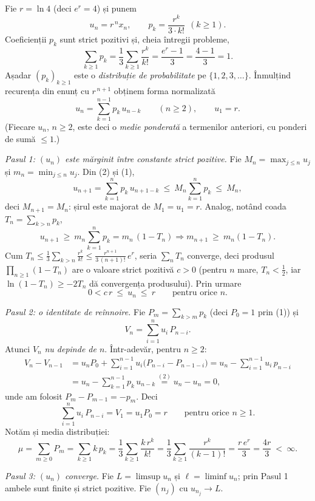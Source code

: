 Fie $r=\ln4$ (deci $e^{r}=4$) și punem
\[ u_n=r^{\,n}x_n,\qquad p_k=\frac{r^{k}}{3\cdot k!}\ \ (k\ge1) . \]
Coeficienții $p_k$ sunt strict pozitivi și, cheia întregii probleme,
\[ \sum_{k\ge1}p_k=\frac{1}{3}\sum_{k\ge1}\frac{r^k}{k!}=\frac{e^{r}-1}{3}=\frac{4-1}{3}=1 . \tag{1} \]
Așadar $(p_k)_{k\ge1}$ este o \emph{distribuție de probabilitate} pe $\{1,2,3,\dots\}$. Înmulțind recurența din enunț cu $r^{\,n+1}$ obținem forma normalizată
\[ u_{n}=\sum_{k=1}^{n-1}p_k\,u_{n-k}\qquad(n\ge2),\qquad u_1=r . \tag{2} \]
(Fiecare $u_n$, $n\ge2$, este deci o \emph{medie ponderată} a termenilor anteriori, cu ponderi de sumă $\le1$.)

\emph{Pasul 1: $(u_n)$ este mărginit între constante strict pozitive.}
Fie $M_n=\max_{j\le n}u_j$ și $m_n=\min_{j\le n}u_j$. Din (2) și (1),
\[ u_{n+1}=\sum_{k=1}^{n}p_k\,u_{n+1-k}\ \le\ M_n\sum_{k=1}^{n}p_k\ \le\ M_n , \]
deci $M_{n+1}=M_n$: șirul este majorat de $M_1=u_1=r$. Analog, notând coada $T_n=\sum_{k>n}p_k$,
\[ u_{n+1}\ \ge\ m_n\sum_{k=1}^{n}p_k=m_n\,(1-T_n) \Longrightarrow m_{n+1}\ \ge\ m_n(1-T_n) . \]
Cum $T_n\le\frac{1}{3}\sum_{k>n}\frac{r^k}{k!}\le\frac{r^{n+1}}{3\,(n+1)!}\,e^{r}$, seria $\sum_n T_n$ converge, deci produsul $\prod_{n\ge1}(1-T_n)$ are o valoare strict pozitivă $c>0$ (pentru $n$ mare, $T_n<\frac12$, iar $\ln(1-T_n)\ge-2T_n$ dă convergența produsului). Prin urmare
\[ 0<c\,r\ \le\ u_n\ \le\ r\qquad\text{pentru orice }n . \]

\emph{Pasul 2: o identitate de reînnoire.} Fie $P_m=\sum_{k>m}p_k$ (deci $P_0=1$ prin (1)) și
\[ V_n=\sum_{i=1}^{n}u_i\,P_{n-i} . \]
Atunci $V_n$ \emph{nu depinde de $n$}. Într-adevăr, pentru $n\ge2$:
\[ \begin{aligned} V_n-V_{n-1}&=u_nP_0+\sum_{i=1}^{n-1}u_i\bigl(P_{n-i}-P_{n-1-i}\bigr)=u_n-\sum_{i=1}^{n-1}u_i\,p_{n-i}\\ &=u_n-\sum_{k=1}^{n-1}p_k\,u_{n-k}\overset{(2)}{=}u_n-u_n=0 , \end{aligned} \]
unde am folosit $P_{m}-P_{m-1}=-p_{m}$. Deci
\[ \sum_{i=1}^{n}u_i\,P_{n-i}=V_1=u_1P_0=r\qquad\text{pentru orice }n\ge1 . \tag{3} \]
Notăm și media distribuției:
\[ \mu=\sum_{m\ge0}P_m=\sum_{k\ge1}k\,p_k=\frac13\sum_{k\ge1}\frac{k\,r^k}{k!}=\frac13\sum_{k\ge1}\frac{r^{k}}{(k-1)!}=\frac{r\,e^{r}}{3}=\frac{4r}{3}\ <\ \infty . \tag{4} \]

\emph{Pasul 3: $(u_n)$ converge.} Fie $L=\limsup u_n$ și $\ell=\liminf u_n$; prin Pasul 1 ambele sunt finite și strict pozitive. Fie $(n_j)$ cu $u_{n_j}\to L$.

